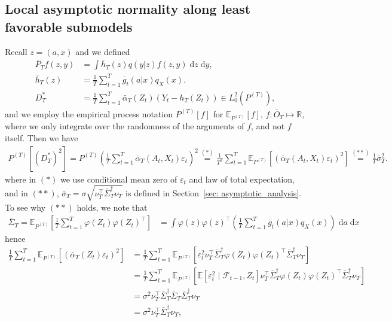 \documentclass[11pt]{article}
\begin{document}
\subsection{Local asymptotic normality along least favorable submodels}
\label{appendix:least_favorable_submodel}
Recall $z = (a,x)$ and we defined
\begin{align*}
    \bar{P}_T f(z,y) &= \int \bar{h}_T(z)q(y|z)f(z, y)\;\mathrm{d}z\;\mathrm{d}y,\\
    \bar{h}_T(z) &= \frac{1}{T}\sum_{t=1}^{T}\bar{g}_t(a|x)q_X(x).\\
    D_T^{\ast} &= \frac{1}{T}\sum_{t=1}^{T}\bar{\alpha}_T(Z_t)(Y_t - h_T(Z_t)) \in L_0^2(P^{(T)}),
\end{align*}
and we employ the empirical process notation $P^{(T)}[f]$ for $\mathbb{E}_{P^{(T)}}[f]$, $f : \bar{O}_T \mapsto \mathbb{R}$, where we only integrate over the randomness of the arguments of $f$, and not $f$ itself. Then we have
\begin{align*}
    P^{(T)}[(D_T^{\ast})^2] = P^{(T)}\left(\frac{1}{T}\sum_{t=1}^{T}\bar{\alpha}_T(A_t, X_t)\varepsilon_t\right)^2 \overset{(\ast)}{=} \frac{1}{T^2}\sum_{t=1}^{T}\mathbb{E}_{P^{(T)}}\left[(\bar{\alpha}_T(A_t, X_t)\varepsilon_t)^2\right] 
    \overset{(\ast\ast)}{=} \frac{1}{T}\bar{\sigma}_T^2. 
\end{align*}
where in $(\ast)$ we use conditional mean zero of $\varepsilon_t$ and law of total expectation, and in $(\ast\ast)$, $\bar{\sigma}_T = \sigma\sqrt{\nu_T^{\top}\bar{\Sigma}_T^{\dag}\nu_T}$ is defined in Section~\ref{sec: asymptotic_analysis}. To see why $(\ast\ast)$ holds, we note that 
\begin{align*}
    \bar{\Sigma}_T = \mathbb{E}_{P^{(T)}}\left[\frac{1}{T}\sum_{t=1}^{T}\varphi(Z_t)\varphi(Z_t)^{\top}\right] &= \int \varphi(z)\varphi(z)^{\top}\left(\frac{1}{T}\sum_{t=1}^{T}\bar{g}_t(a|x)q_X(x)\right)\;\mathrm{d}a\;\mathrm{d}x
\end{align*}
hence 
\begin{align}
    \frac{1}{T}\sum_{t=1}^{T}\mathbb{E}_{P^{(T)}}\left[(\bar{\alpha}_T(Z_t)\varepsilon_t)^2\right] &= \frac{1}{T}\sum_{t=1}^{T}\mathbb{E}_{P^{(T)}}\left[\varepsilon_t^2 \nu_T^{\top}\bar{\Sigma}_T^{\dag}\varphi(Z_t)\varphi(Z_t)^{\top}\bar{\Sigma}_T^{\dag}\nu_T\right] \nonumber\\
    &= \frac{1}{T}\sum_{t=1}^{T}\mathbb{E}_{P^{(T)}}\left[\mathbb{E}[\varepsilon_t^2\mid \mathcal{F}_{t-1}, Z_t] \nu_T^{\top}\bar{\Sigma}_T^{\dag}\varphi(Z_t)\varphi(Z_t)^{\top}\bar{\Sigma}_T^{\dag}\nu_T\right] \nonumber\\
    &= \sigma^2 \nu_T^{\top}\bar{\Sigma}_T^{\dag}\bar{\Sigma}_T \bar{\Sigma}_T^{\dag}\nu_T \nonumber\\
    &= \sigma^2 \nu_T^{\top}\bar{\Sigma}_T^{\dag}\nu_T, \label{eq: sigma_bar_T_nu_expression}
\end{align}
\end{document}
